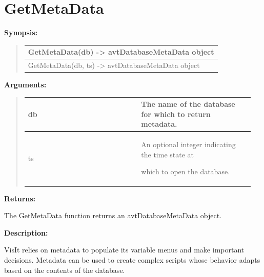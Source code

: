 \documentclass[letterpaper,10pt,english]{sphinxmanual}
\begin{document}
\section{GetMetaData}
\label{functions:getmetadata}
\begin{DUlineblock}{0em}
\item[] \textbf{Synopsis:}
\end{DUlineblock}
\begin{quote}

\begin{tabulary}{\linewidth}{|L|}
\hline

GetMetaData(db) -\textgreater{} avtDatabaseMetaData object
\\
\hline
GetMetaData(db, ts) -\textgreater{} avtDatabaseMetaData object
\\
\hline\end{tabulary}

\end{quote}

\begin{DUlineblock}{0em}
\item[] 
\item[] \textbf{Arguments:}
\end{DUlineblock}
\begin{quote}

\begin{tabular}{|p{0.475\linewidth}|p{0.475\linewidth}|}
\hline

db
 & 
The name of the database for which to return metadata.
\\
\hline
ts
 & 
\begin{DUlineblock}{0em}
\item[] An optional integer indicating the time state at
\item[] which to open the database.
\end{DUlineblock}
\\
\hline\end{tabular}

\end{quote}

\begin{DUlineblock}{0em}
\item[] 
\item[] \textbf{Returns:}
\item[] The GetMetaData function returns an avtDatabaseMetaData object.
\item[] 
\item[] \textbf{Description:}
\item[] VisIt relies on metadata to populate its variable menus and make important
decisions. Metadata can be used to create complex scripts whose behavior
adapts based on the contents of the database.
\end{DUlineblock}
\end{document}

